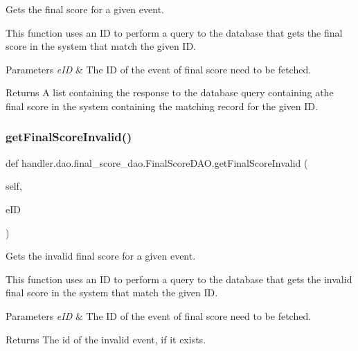 Gets the final score for a given event. 

This function uses an ID to perform a query to the database that gets the final score in the system that match the given ID.


\begin{DoxyParams}{Parameters}
{\em e\+ID} & The ID of the event of final score need to be fetched.\\
\hline
\end{DoxyParams}
\begin{DoxyReturn}{Returns}
A list containing the response to the database query containing athe final score in the system containing the matching record for the given ID. 
\end{DoxyReturn}
\mbox{\label{classhandler_1_1dao_1_1final__score__dao_1_1_final_score_d_a_o_a5236be2fb1a7a2d4a0ace18bf06f6fdd}} 
\subsubsection{\texorpdfstring{get\+Final\+Score\+Invalid()}{getFinalScoreInvalid()}}
{\footnotesize\ttfamily def handler.\+dao.\+final\+\_\+score\+\_\+dao.\+Final\+Score\+D\+A\+O.\+get\+Final\+Score\+Invalid (\begin{DoxyParamCaption}\item[{}]{self,  }\item[{}]{e\+ID }\end{DoxyParamCaption})}



Gets the invalid final score for a given event. 

This function uses an ID to perform a query to the database that gets the invalid final score in the system that match the given ID.


\begin{DoxyParams}{Parameters}
{\em e\+ID} & The ID of the event of final score need to be fetched.\\
\hline
\end{DoxyParams}
\begin{DoxyReturn}{Returns}
The id of the invalid event, if it exists. 
\end{DoxyReturn}
\mbox{\label{classhandler_1_1dao_1_1final__score__dao_1_1_final_score_d_a_o_a750aa3375dc03fbc85025476a9974349}} 
